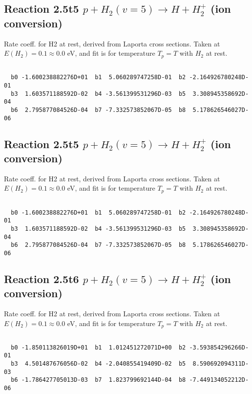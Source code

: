 \documentclass[12pt,dvipdfmx]{article}
\begin{document}
\newpage
\subsection{
Reaction 2.5t5
$ p + H_2(v=5) \rightarrow H + H_2^+$ (ion conversion)
}
Rate coeff. for H2 at rest, derived from Laporta cross sections.
Taken at $E(H_2) = 0.1 \approx 0.0$ eV,  and fit is for temperature $T_p=T$ with $H_2$ at rest.

\begin{small}\begin{verbatim}

  b0 -1.600238882276D+01  b1  5.060289747258D-01  b2 -2.164926780248D-01
  b3  1.603571188592D-02  b4 -3.561399531296D-03  b5  3.308945358692D-04
  b6  2.795877084526D-04  b7 -7.332573852067D-05  b8  5.178626546027D-06

\end{verbatim}\end{small}

\newpage
\subsection{
Reaction 2.5t5
$ p + H_2(v=5) \rightarrow H + H_2^+$ (ion conversion)
}
Rate coeff. for H2 at rest, derived from Laporta cross sections.
Taken at $E(H_2) = 0.1 \approx 0.0$ eV,  and fit is for temperature $T_p=T$ with $H_2$ at rest.

\begin{small}\begin{verbatim}

  b0 -1.600238882276D+01  b1  5.060289747258D-01  b2 -2.164926780248D-01
  b3  1.603571188592D-02  b4 -3.561399531296D-03  b5  3.308945358692D-04
  b6  2.795877084526D-04  b7 -7.332573852067D-05  b8  5.178626546027D-06

\end{verbatim}\end{small}

\newpage
\subsection{
Reaction 2.5t6
$ p + H_2(v=5) \rightarrow H + H_2^+$ (ion conversion)
}
Rate coeff. for H2 at rest, derived from Laporta cross sections.
Taken at $E(H_2) = 0.1 \approx 0.0$ eV,  and fit is for temperature $T_p=T$ with $H_2$ at rest.

\begin{small}\begin{verbatim}

  b0 -1.850113826019D+01  b1  1.012451272071D+00  b2 -3.593854296266D-01
  b3  4.501487676056D-02  b4 -2.040855419409D-02  b5  8.590692094311D-03
  b6 -1.786427705013D-03  b7  1.823799692144D-04  b8 -7.449134052212D-06

\end{verbatim}\end{small}
\end{document}
